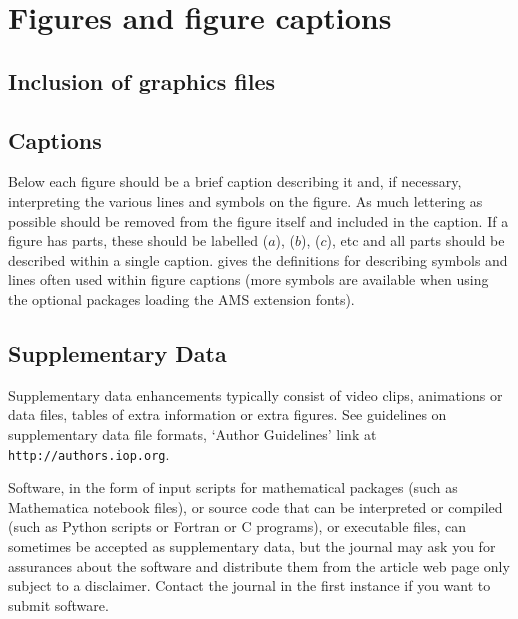 \documentclass[12pt]{iopart}
\begin{document}
\section{Figures and figure captions}

\subsection{Inclusion of graphics files\label{figinc}}

\subsection{Captions}
Below each figure should be a brief caption describing it and, if
necessary, interpreting the various lines and symbols on the figure.
As much lettering as possible should be removed from the figure itself
and included in the caption. If a figure has parts, these should be
labelled ($a$), ($b$), ($c$), etc and all parts should be described
within a single caption.  gives the definitions for describing
symbols and lines often used within figure captions (more symbols are
available when using the optional packages loading the AMS extension fonts).

\subsection{Supplementary Data}

Supplementary data
enhancements typically consist of video clips, animations or
data files, tables of extra information or extra figures. See
guidelines on supplementary data file formats,
`Author Guidelines' link at \verb"http://authors.iop.org".

Software, in the form of input scripts for mathematical packages (such as
Mathematica notebook files), or source code that can be interpreted or
compiled (such as Python scripts or Fortran or C programs), or executable
files, can sometimes be accepted as supplementary data, but the journal
may ask you for assurances about the software and distribute them from
the article web page only subject to a disclaimer.  Contact the journal
in the first instance if you want to submit software.
\end{document}
